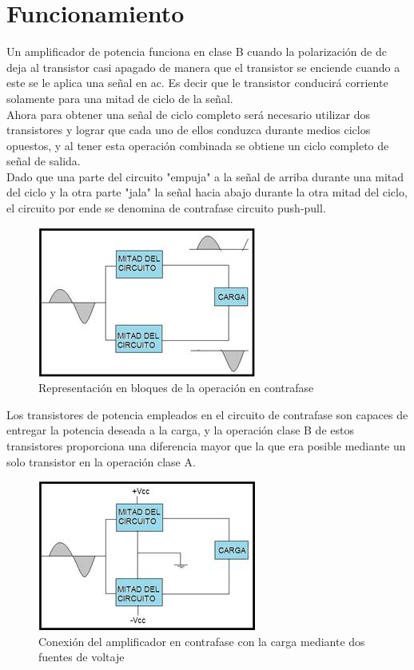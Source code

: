 \documentclass[12pt,a4paper]{article}
\begin{document}
\section{Funcionamiento}
Un amplificador de potencia funciona en clase B cuando la polarización de dc deja al transistor casi apagado de manera que el transistor se enciende cuando a este se le aplica una señal en ac. Es decir que le transistor conducirá corriente solamente para una mitad de ciclo de la señal.\\
Ahora para obtener una señal de ciclo completo será necesario utilizar dos transistores y lograr que cada uno de ellos conduzca durante medios ciclos opuestos, y al tener esta operación combinada se obtiene un ciclo completo de señal de salida.\\
Dado que una parte del circuito "empuja" a la señal de arriba durante una mitad del ciclo y la otra parte "jala" la señal hacia abajo durante la otra mitad del ciclo, el circuito por ende se denomina de contrafase circuito push-pull.
\begin{figure}[hbtp]
\centering
\includegraphics[scale=1.2]{Pictures/1.jpg}
\caption{Representación en bloques de la operación en contrafase}
\end{figure}

Los transistores de potencia empleados en el circuito de contrafase son capaces de entregar la potencia deseada a la carga, y la operación clase B de estos transistores proporciona una diferencia mayor que la que era posible mediante un solo transistor en la operación clase A.
\begin{figure}[hbtp]
\centering
\includegraphics[scale=1.2]{Pictures/2.jpg}
\caption{Conexión del amplificador en contrafase con la carga mediante dos fuentes de voltaje}
\end{figure}
\end{document}
